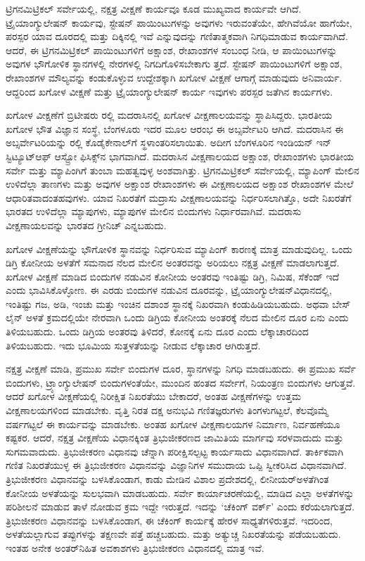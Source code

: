 ಟ್ರಿಗನಮಿಟ್ರಿಕಲ್​ ಸರ್ವೇಯಲ್ಲಿ, ನಕ್ಷತ್ರ ವೀಕ್ಷಣೆ ಕಾರ್ಯವೂ ಕೂಡ ಮುಖ್ಯವಾದ ಕಾರ್ಯವೇ ಆಗಿದೆ. ಟ್ರೈಯಾಂಗ್ಯುಲೇಷನ್​ ಕಾರ್ಯವು, ಸ್ಟೇಷನ್​ ಪಾಯಿಂಟುಗಳನ್ನು ಅವುಗಳು ಇರುವಂತೆಯೇ, ಹೇಗಿವೆಯೋ ಹಾಗೆಯೇ, ಪರಸ್ಪರ ಯಾವ ದೂರದಲ್ಲಿ ಮತ್ತು ದಿಕ್ಕಿನಲ್ಲಿ ಇವೆ ಎನ್ನುವುದನ್ನು ಗಣಿತಾತ್ಮಕವಾಗಿ ನಿಗಧಿಮಾಡುವ ಕಾರ್ಯವಾಗಿದೆ. ಆದರೆ, ಈ ಟ್ರಿಗನಮಿಟ್ರಿಕಲ್​ ಪಾಯಿಂಟುಗಳಿಗೆ ಅಕ್ಷಾಂಶ, ರೇಖಾಂಶಗಳ ಸಂಬಂಧ ನೀಡಿ, ಆ ಪಾಯಿಂಟುಗಳನ್ನು ಅವುಗಳ ಭೌಗೋಳಿಕ ಸ್ಥಾನಗಳಲ್ಲಿ ನೇರಗಳಲ್ಲಿ ನಿಗದಿಗೊಳಿಸಬೇಕಾಗು ತ್ತದೆ. ಸ್ಟೇಷನ್​ ಪಾಯಿಂಟುಗಳಿಗೆ ಅಕ್ಷಾಂಶ, ರೇಖಾಂಶಗಳ ಮೌಲ್ಯವನ್ನು ಕಂಡುಕೊಳ್ಳುವ ಉದ್ದೇಶಕ್ಕಾಗಿ ಖಗೋಳ ವೀಕ್ಷಣೆ ಆಗಾಗ್ಗೆ ಮಾಡುವುದು ಅನಿವಾರ್ಯ. ಆದ್ದರಿಂದ ಖಗೋಳ ವೀಕ್ಷಣೆ ಮತ್ತು ಟ್ರೈಯಾಂಗ್ಯುಲೇಷನ್​ ಕಾರ್ಯ ಇವುಗಳು ಪರಸ್ಪರ ಜತೆಗಿನ ಕಾರ್ಯಗಳು.

ಖಗೋಳ ವೀಕ್ಷಣೆಗೆ ಬ್ರಿಟೀಷರು ರಲ್ಲಿ ಮದರಾಸಿನಲ್ಲಿ ಖಗೋಳ ವೀಕ್ಷಣಾಲಯವನ್ನು ಸ್ಥಾಪಿಸಿದ್ದರು. ಭಾರತೀಯ ಖಗೋಳ ಭೌತ ವಿಜ್ಞಾನ ಸಂಸ್ಥೆ, ಬೆಂಗಳೂರು ಇದರ ಮೂಲ ಆರಂಭ ಈ ಅಬ್ಸರ್ವೇಟರಿ ಆಗಿದೆ. ಮದರಾಸಿನ ಈ ಅಬ್ಸರ್ವೇಟರಿಯನ್ನು ರಲ್ಲಿ ಕೊಡೈಕೇನಾಲ್​ಗೆ ಸ್ಥಳಾಂತರಿಸಲಾಯಿತು. ಅದೀಗ ಬೆಂಗಳೂರಿನ ಇಂಡಿಯನ್​ ಇನ್​ಸ್ಟಿಟ್ಯೂಟ್​ ಆಫ್​ ಆಸ್ಟ್ರೋ ಫಿಸಿಕ್ಸ್​ನ ಭಾಗವಾಗಿದೆ. ಮದರಾಸಿನ ವೀಕ್ಷಣಾಲಯದ ಅಕ್ಷಾಂಶ, ರೇಖಾಂಶಗಳು ಭಾರತೀಯ ಸರ್ವೇ ಮತ್ತು ಮ್ಯಾಪಿಂಗಿಗೆ ತುಂಬಾ ಮಹತ್ವವುಳ್ಳ ಅಂಶವಾಗಿತ್ತು. ಟ್ರಿಗನಮಿಟ್ರಿಕಲ್​ ಸರ್ವೇಯಲ್ಲಿ, ಮ್ಯಾಪಿಂಗ್​ ಮೇಲಿನ ಉಳಿದೆಲ್ಲಾ ತಾಣಗಳು ಮತ್ತು ಅವುಗಳ ಅಕ್ಷಾಂಶ ರೇಖಾಂಶಗಳು ಈ ವೀಕ್ಷಣಾಲಯದ ಅಕ್ಷಾಂಶ ರೇಖಾಂಶಗಳ ಮೇಲೆ ಆಧಾರಿತವಾದಂತಹವುಗಳು. ಯಾವ ನಿಖರತೆಗೆ ಮದ್ರಾಸು ವೀಕ್ಷಣಾಲಯವನ್ನು ನಿರ್ಧರಿಸಲಾಗಿತ್ತೊ, ಅದೇ ನಿಖರತೆಗೆ ಭಾರತದ ಉಳಿದೆಲ್ಲಾ ಮ್ಯಾಪುಗಳು, ಮ್ಯಾಪುಗಳ ಮೇಲಿನ ಬಿಂದುಗಳು ನಿರ್ಧಾರವಾಗಿವೆ. ಮದರಾಸು ವೀಕ್ಷಣಾಯಲವನ್ನು ಭಾರತದ ಗ್ರೀನಿಚ್​ ಎನ್ನಬಹುದು.

ಖಗೋಳ ವೀಕ್ಷಣೆಯನ್ನು ಭೌಗೋಳಿಕ ಸ್ಥಾನವನ್ನು ನಿರ್ಧರಿಸುವ ಮ್ಯಾಪಿಂಗ್​ ಕಾರಣಕ್ಕೆ ಮಾತ್ರ ಮಾಡುವುದಿಲ್ಲ. ಒಂದು ಡಿಗ್ರಿ ಕೋನೀಯ ಅಳತೆಗೆ ಸಮನಾದ ನೆಲದ ಮೇಲಿನ ಅಂತರವನ್ನು ಅರಿಯಲು ನಕ್ಷತ್ರ ವೀಕ್ಷಣೆ ಮಾಡಲಾಗುತ್ತದೆ. ಖಗೋಳ ವೀಕ್ಷಣೆ ಮಾಡಿದ  ಬಿಂದುಗಳ ನಡುವಿನ ಕೋನೀಯ ಅಂತರವು ಇಂತಿಷ್ಟು ಡಿಗ್ರಿ, ನಿಮಿಷ, ಸೆಕೆಂಡ್​ ಇದೆ ಎಂದು ಭಾವಿಸಿಕೊಳ್ಳೋಣ. ಈ ಎರಡು ಬಿಂದುಗಳ ನಡುವಿನ ದೂರವನ್ನು, ಟ್ರೈಯಾಂಗ್ಯುಲೇಷನ್​ ವಿಧಾನದಲ್ಲಿ, ಇಂತಿಷ್ಟು ಗಜ, ಅಡಿ, ಇಂಚು ಮತ್ತು ಇಂಚಿನ ದಶಾಂಶ ಸ್ಥಾನಕ್ಕೆ ನಿಖರವಾಗಿ ಕಂಡುಹಿಡಿಯಬಹುದು. ಅಥವಾ ಬೇಸ್​ ಲೈನ್​ ಅಳತೆ ಕ್ರಮದಲ್ಲಿಯೇ ನೇರವಾಗಿ ಒಂದು ಡಿಗ್ರಿಯ ಕೋನೀಯ ಅಂತರಕ್ಕೆ ನೆಲದ ಮೇಲಿನ ದೂರ ಏನು ಎಂದು ತಿಳಿಯಬಹುದು. ಒಂದು ಡಿಗ್ರಿಯ ಅಂತರವು ತಿಳಿದರೆ,  ಕೋನಕ್ಕೆ ಏನು ದೂರ ಎಂದು ಲೆಕ್ಕಾಚಾರದಿಂದ ತಿಳಿಯಬಹುದು. ಇದು ಭೂಮಿಯ ಸುತ್ತಳತೆಯನ್ನು ನೀಡುವ ಲೆಕ್ಕಾಚಾರ ಆಗಿರುತ್ತದೆ.

ನಕ್ಷತ್ರ ವೀಕ್ಷಣೆ ಮಾಡಿ, ಪ್ರಮುಖ ಸರ್ವೇ ಬಿಂದುಗಳ ದೂರ, ಸ್ಥಾನಗಳನ್ನು ನಿಗಧಿ ಮಾಡಬಹುದು. ಈ ಪ್ರಮುಖ ಸರ್ವೆ ಬಿಂದುಗಳು, ಟ್ರ್ಯಾಂಗ್ಯುಲೇಷನ್​ ಬಿಂದುಗಳಂತೆಯೇ, ಮುಂದಿನ ಹಂತದ ಸರ್ವೇಗೆ, ನಿಯಂತ್ರಣ ಬಿಂದುಗಳು ಆಗುತ್ತವೆ. ಆದರೆ ಖಗೋಳ ವೀಕ್ಷಣೆಯಲ್ಲಿ ನಿರೀಕ್ಷಿತ ನಿಖರತೆಯು ಬೇಕಾದರೆ, ಅಂತಹ ವೀಕ್ಷಣೆಗಳನ್ನು ಉತ್ತಮ ವೀಕ್ಷಣಾಲಯಗಳಿಂದ ಮಾಡಬೇಕು. ವೃತ್ತಿ ನಿರತ ದಕ್ಷ ಅನುಭವಿ ಗಣಿತಜ್ಞರುಗಳು ತಿಂಗಳುಗಟ್ಟಲೆ, ಕೆಲವೊಮ್ಮೆ ವರ್ಷಗಟ್ಟಲೆ ಈ ಕಾರ್ಯವನ್ನು ಮಾಡಬೇಕು. ಅಂತಹ ಖಗೋಳ ವೀಕ್ಷಣಾಲಯಗಳ ನಿರ್ಮಾಣ, ನಿರ್ವಹಣೆಯೂ ಕಷ್ಟಕರ. ಆದರೆ, ನಕ್ಷತ್ರ ವೀಕ್ಷಣೆಯ ವಿಧಾನಕ್ಕಿಂತ ತ್ರಿಭುಜೀಕರಣದ ಜಾಮಿತಿಯ ಮಾರ್ಗವು ಸರಳವಾದುದು ಮತ್ತು ಸುಗಮವಾದುದು. ತ್ರಿಭುಜೀಕರಣ ವಿಧಾನವು ಚೆನ್ನಾಗಿ ಪರೀಕ್ಷಿಸಲ್ಪಟ್ಟ ಕಾರ್ಯಸಾದು ವಿಧಾನವಾಗಿದೆ. ತಾರ್ಕಿಕವಾಗಿ ಗಣಿತ ನಿಖರತೆಯುಳ್ಳ ಈ ತ್ರಿಭುಜೀಕರಣ ವಿಧಾನವನ್ನು ವಿಜ್ಞಾನಿಗಳ ಸಮುದಾಯ ಒಪ್ಪಿ ಸ್ವೀಕರಿಸಿದ ವಿಧಾನವಾಗಿದೆ. ತ್ರಿಭುಜೀಕರಣ ವಿಧಾನವನ್ನು ಬಳಸಿಕೊಂಡಾಗ, ಕಾಡು ಮೇಡಿನ ವಿಶಾಲ ಪ್ರದೇಶದಲ್ಲಿ, ಲೀನೀಯರ್​ ಅಳತೆಗಿಂತ ಕೋನೀಯ ಅಳತೆಯನ್ನು ಸುಲಭವಾಗಿ ಮಾಡಬಹುದು. ಸರ್ವೇ ಕಾರ್ಯಾಚರಣೆಯಲ್ಲಿ, ಮಾಡಿದ ಎಲ್ಲಾ ಅಳತೆಗಳನ್ನು ಪರಿಶೀಲನೆ ಮಾಡುವ ತಾಳೆ ನೋಡುವ ಕ್ರಮ ಇದ್ದೇ ಇರುತ್ತದೆ. ಇದನ್ನು ‘ಚೆಕಿಂಗ್​ ವರ್ಕ್’ ಎಂದು ಕರೆಯಲಾಗುತ್ತದೆ. ತ್ರಿಭುಜೀಕರಣ ವಿಧಾನವನ್ನು ಬಳಸಿಕೊಂಡಾಗ, ಈ ಚೆಕಿಂಗ್​ ಕಾರ್ಯಕ್ಕೆ ಹೇರಳ ಸಾಧ್ಯತೆಗಳಿರುತ್ತವೆ. ಇದರಿಂದ, ಅಳತೆಯಲ್ಲಾಗುವ ತಪ್ಪುಗಳನ್ನು ತಕ್ಷಣವೇ ಪತ್ತೆ ಹಚ್ಚಬಹುದು. ಮತ್ತು ಅತ್ಯುಚ್ಚ ನಿಖರತೆಯನ್ನು ಪಡೆಯಬಹುದು. ಇಂತಹ ಅನೇಕ ಅಂತರ್​ನಿಹಿತ ಅವಕಾಶಗಳು ತ್ರಿಭುಜೀಕರಣ ವಿಧಾನದಲ್ಲಿ ಮಾತ್ರ ಇವೆ.


